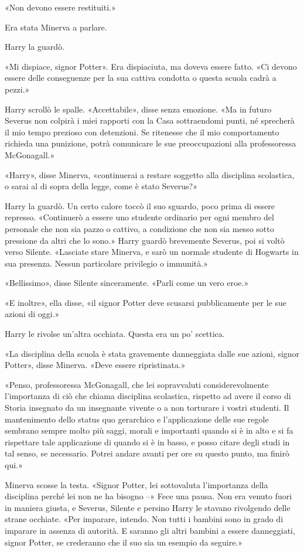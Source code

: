 «Non devono essere restituiti.»

Era stata Minerva a parlare.

Harry la guardò.

«Mi dispiace, signor Potter». Era dispiaciuta, ma doveva essere fatto. «Ci devono essere delle conseguenze per la sua cattiva condotta o questa scuola cadrà a pezzi.»

Harry scrollò le spalle. «Accettabile», disse senza emozione. «Ma in futuro Severus non colpirà i miei rapporti con la Casa sottraendomi punti, né sprecherà il mio tempo prezioso con detenzioni. Se ritenesse che il mio comportamento richieda una punizione, potrà comunicare le sue preoccupazioni alla professoressa McGonagall.»

«Harry», disse Minerva, «continuerai a restare soggetto alla disciplina scolastica, o sarai al di sopra della legge, come è stato Severus?»

Harry la guardò. Un certo calore toccò il suo sguardo, poco prima di essere represso. «Continuerò a essere uno studente ordinario per ogni membro del personale che non sia pazzo o cattivo, a condizione che non sia messo sotto pressione da altri che lo sono.» Harry guardò brevemente Severus, poi si voltò verso Silente. «Lasciate stare Minerva, e sarò un normale studente di Hogwarts in sua presenza. Nessun particolare privilegio o immunità.»

«Bellissimo», disse Silente sinceramente. «Parli come un vero eroe.»

«E inoltre», ella disse, «il signor Potter deve scusarsi pubblicamente per le sue azioni di oggi.»

Harry le rivolse un’altra occhiata. Questa era un po’ scettica.

«La disciplina della scuola è stata gravemente danneggiata dalle sue azioni, signor Potter», disse Minerva. «Deve essere ripristinata.»

«Penso, professoressa McGonagall, che lei sopravvaluti considerevolmente l’importanza di ciò che chiama disciplina scolastica, rispetto ad avere il corso di Storia insegnato da un insegnante vivente o a non torturare i vostri studenti. Il mantenimento dello status quo gerarchico e l’applicazione delle sue regole sembrano sempre molto più saggi, morali e importanti quando si è in alto e si fa rispettare tale applicazione di quando si è in basso, e posso citare degli studi in tal senso, se necessario. Potrei andare avanti per ore su questo punto, ma finirò qui.»

Minerva scosse la testa. «Signor Potter, lei sottovaluta l’importanza della disciplina perché lei non ne ha bisogno –» Fece una pausa. Non era venuto fuori in maniera giusta, e Severus, Silente e persino Harry le stavano rivolgendo delle strane occhiate. «Per imparare, intendo. Non tutti i bambini sono in grado di imparare in assenza di autorità. E saranno gli altri bambini a essere danneggiati, signor Potter, se crederanno che il suo sia un esempio da seguire.»

